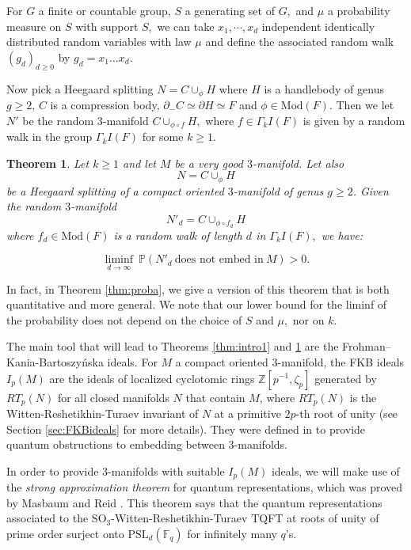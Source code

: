 \documentclass[12pt]{amsart}
\newtheorem{thm}{Theorem}[section]
\theoremstyle{definition}
\newcommand{\Z}{\mathbb{Z}}
\begin{document}
For $G$ a finite or countable group, $S$ a generating set of $G,$ and $\mu$ a probability measure on $S$ with support $S,$ we can take $x_1,\cdots,x_d$ independent identically distributed random variables with law $\mu$ and define the associated random walk $(g_d)_{d\geq 0}$ by $g_d=x_1\ldots x_d$.


 Now pick a Heegaard splitting $N=C\cup_\phi H$ where $H$ is a handlebody of genus $g\geq 2$, $C$ is a compression body, $\partial_- C\simeq \partial H \simeq F$ and $\phi\in \mathrm{Mod}(F).$ Then we let $N'$ be the random $3$-manifold $C\cup_{\phi\circ f} H,$ where $f\in \Gamma_kI(F)$ is given by a random walk in the group $\Gamma_k I(F)$ for some $k\geq 1.$ 

\begin{thm}
	\label{thm:main2} Let $k\geq 1$ and let $M$ be a very good $3$-manifold. Let also 
	$$N=C\cup_{\phi} H$$ be a Heegaard splitting of a compact oriented $3$-manifold of genus $g\geq 2$. Given the random $3$-manifold $$N'_d=C\cup_{\phi\circ f_d} H$$ where $f_d\in \mathrm{Mod}(F)$ is a random walk of length $d$ in $\Gamma_kI(F),$ we have:
	
	$$\underset{d\rightarrow \infty}{\liminf} \ \mathbb{P}(N'_d \ \textrm{does not embed in} \ M)>0.$$
\end{thm}

In fact, in Theorem \ref{thm:proba}, we give a version of this theorem that is both quantitative and more general. We note that our lower bound for the liminf of the probability does not depend on the choice of $S$ and $\mu,$ nor on $k.$ 


The main tool that will lead to Theorems \ref{thm:intro1} and \ref{thm:main2} are the Frohman--Kania-Bartoszy\'nska ideals. For $M$ a compact oriented $3$-manifold, the FKB ideals $I_p(M)$ are the ideals of localized cyclotomic rings $\Z[p^{-1},\zeta_p]$ generated by $RT_p(N)$ for all closed manifolds $N$ that contain $M$, where $RT_p(N)$ is the Witten-Reshetikhin-Turaev invariant of $N$ at a primitive $2p$-th root of unity (see Section \ref{sec:FKBideals} for more details). They were defined in \cite{FKB} to provide quantum obstructions to embedding between $3$-manifolds. 

In order to provide $3$-manifolds with suitable $I_p(M)$ ideals, we will make use of the \textit{strong approximation theorem} for quantum representations, which was proved by Masbaum and Reid \cite{MR12}. This theorem says that the quantum representations associated to the $\mathrm{SO}_3$-Witten-Reshetikhin-Turaev TQFT at roots of unity of prime order surject onto $\mathrm{PSL}_d(\mathbb{F}_q)$ for infinitely many $q$'s.
\end{document}
